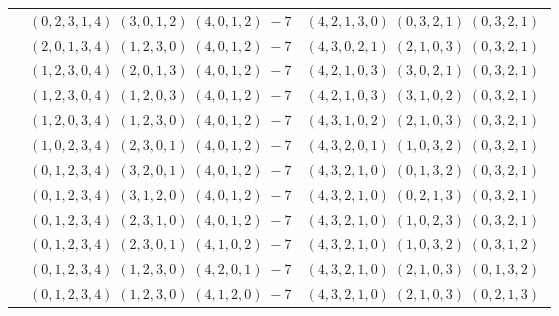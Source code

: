 \documentclass[11pt]{article}
\begin{document}
\begin{longtable}[l]{|c|c|c|}
 \cline{2-3} 
 & $(0 ,2 ,3 ,1 ,4) \;(3 ,0 ,1 ,2) \;(4 ,0 ,1 ,2) \;-7$ & $(4 ,2 ,1 ,3 ,0) \;(0 ,3 ,2 ,1) \;(0 ,3 ,2 ,1) \;$\\ 
 \cline{2-3} 
 & $(2 ,0 ,1 ,3 ,4) \;(1 ,2 ,3 ,0) \;(4 ,0 ,1 ,2) \;-7$ & $(4 ,3 ,0 ,2 ,1) \;(2 ,1 ,0 ,3) \;(0 ,3 ,2 ,1) \;$\\ 
 \cline{2-3} 
 & $(1 ,2 ,3 ,0 ,4) \;(2 ,0 ,1 ,3) \;(4 ,0 ,1 ,2) \;-7$ & $(4 ,2 ,1 ,0 ,3) \;(3 ,0 ,2 ,1) \;(0 ,3 ,2 ,1) \;$\\ 
 \cline{2-3} 
 & $(1 ,2 ,3 ,0 ,4) \;(1 ,2 ,0 ,3) \;(4 ,0 ,1 ,2) \;-7$ & $(4 ,2 ,1 ,0 ,3) \;(3 ,1 ,0 ,2) \;(0 ,3 ,2 ,1) \;$\\ 
 \cline{2-3} 
 & $(1 ,2 ,0 ,3 ,4) \;(1 ,2 ,3 ,0) \;(4 ,0 ,1 ,2) \;-7$ & $(4 ,3 ,1 ,0 ,2) \;(2 ,1 ,0 ,3) \;(0 ,3 ,2 ,1) \;$\\ 
 \cline{2-3} 
 & $(1 ,0 ,2 ,3 ,4) \;(2 ,3 ,0 ,1) \;(4 ,0 ,1 ,2) \;-7$ & $(4 ,3 ,2 ,0 ,1) \;(1 ,0 ,3 ,2) \;(0 ,3 ,2 ,1) \;$\\ 
 \cline{2-3} 
 & $(0 ,1 ,2 ,3 ,4) \;(3 ,2 ,0 ,1) \;(4 ,0 ,1 ,2) \;-7$ & $(4 ,3 ,2 ,1 ,0) \;(0 ,1 ,3 ,2) \;(0 ,3 ,2 ,1) \;$\\ 
 \cline{2-3} 
 & $(0 ,1 ,2 ,3 ,4) \;(3 ,1 ,2 ,0) \;(4 ,0 ,1 ,2) \;-7$ & $(4 ,3 ,2 ,1 ,0) \;(0 ,2 ,1 ,3) \;(0 ,3 ,2 ,1) \;$\\ 
 \cline{2-3} 
 & $(0 ,1 ,2 ,3 ,4) \;(2 ,3 ,1 ,0) \;(4 ,0 ,1 ,2) \;-7$ & $(4 ,3 ,2 ,1 ,0) \;(1 ,0 ,2 ,3) \;(0 ,3 ,2 ,1) \;$\\ 
 \cline{2-3} 
 & $(0 ,1 ,2 ,3 ,4) \;(2 ,3 ,0 ,1) \;(4 ,1 ,0 ,2) \;-7$ & $(4 ,3 ,2 ,1 ,0) \;(1 ,0 ,3 ,2) \;(0 ,3 ,1 ,2) \;$\\ 
 \cline{2-3} 
 & $(0 ,1 ,2 ,3 ,4) \;(1 ,2 ,3 ,0) \;(4 ,2 ,0 ,1) \;-7$ & $(4 ,3 ,2 ,1 ,0) \;(2 ,1 ,0 ,3) \;(0 ,1 ,3 ,2) \;$\\ 
 \cline{2-3} 
 & $(0 ,1 ,2 ,3 ,4) \;(1 ,2 ,3 ,0) \;(4 ,1 ,2 ,0) \;-7$ & $(4 ,3 ,2 ,1 ,0) \;(2 ,1 ,0 ,3) \;(0 ,2 ,1 ,3) \;$\\ \hline
  
 \end{longtable} 
 
\end{document}
